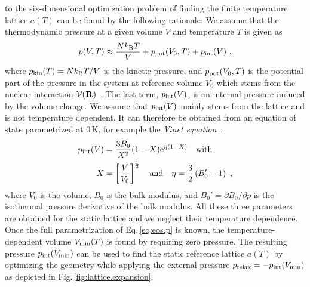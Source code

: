  to the six-dimensional optimization problem of finding the finite temperature lattice $a (T)$ can be  found by the following rationale: We assume that the thermodynamic pressure at a given volume $V$ and temperature $T$ is given as
\begin{align}
p (V, T) \approx \frac{N k_{\rm B} T}{V} + p_{\rm pot} (V_0, T) + p_{\rm int}(V)~,
\label{eq:eos.p}
\end{align}
where $p_{\rm kin} (T) = N k_{\rm B} T / V$ is the kinetic pressure, and $p_{\rm pot} (V_0, T)$ is the potential part of the pressure in the system at reference volume $V_0$ which stems from the nuclear interaction $\mathcal V ({\bf R})$~\cite{Hansen1990}. The last term, $p_{\rm int} (V)$, is an internal pressure induced by the volume change. We assume that $p_{\rm int} (V)$ mainly stems from the lattice and is not temperature dependent. It can therefore be obtained from an equation of state parametrized at 0\,K, for example the \emph{Vinet equation}~\cite{Vinet.1987}:
\begin{align}
p_{\rm int} (V) 
&= \frac{3 B_0}{X^2} (1-X) {\rm e}^{\eta (1-X)} \label{eq:p.Vinet} \quad\text{with} \\ 
X &= \left[\frac{V}{V_0}\right]^{\frac{1}{3}}
\quad\text{and}\quad
\eta 
= \frac{3}{2} \left(B_0' - 1 \right)~,
\end{align}
where $V_0$ is the volume, $B_0$ is the bulk modulus, and $B_0' = \partial B_0 / \partial p$ is the isothermal pressure derivative of the bulk modulus. All these three parameters are obtained for the static lattice and we neglect their temperature dependence. Once the full parametrization of Eq.\,\eqref{eq:eos.p} is known, the temperature-dependent volume $V_{\rm min} (T)$ is found by requiring zero pressure. The resulting pressure $p_{\rm int} (V_{\rm min})$ can be used to find the static reference lattice $a(T)$ by optimizing the geometry while applying the external pressure $p_{\rm relax} = - p_{\rm int} (V_{\rm min})$ as depicted in Fig.\,\ref{fig:lattice.expansion}.
